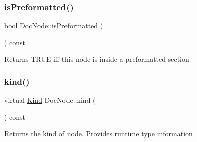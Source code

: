 \mbox{\label{class_doc_node_a79d0b2250794ae96a629d964f60cb2a4}} 
\subsubsection{\texorpdfstring{isPreformatted()}{isPreformatted()}}
{\footnotesize\ttfamily bool Doc\+Node\+::is\+Preformatted (\begin{DoxyParamCaption}{ }\end{DoxyParamCaption}) const\hspace{0.3cm}{\ttfamily [inline]}}

Returns T\+R\+UE iff this node is inside a preformatted section \mbox{\label{class_doc_node_a108ffd214a72ba6e93dac084a8f58049}} 
\subsubsection{\texorpdfstring{kind()}{kind()}}
{\footnotesize\ttfamily virtual \mbox{\hyperlink{class_doc_node_aebd16e89ca590d84cbd40543ea5faadb}{Kind}} Doc\+Node\+::kind (\begin{DoxyParamCaption}{ }\end{DoxyParamCaption}) const\hspace{0.3cm}{\ttfamily [pure virtual]}}

Returns the kind of node. Provides runtime type information 

